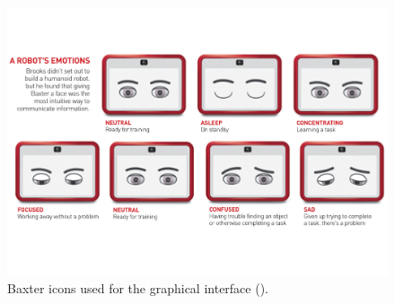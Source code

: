 \begin{figure}
	\centering
	\includegraphics[width=0.8\linewidth]{figures/baxter-icons.pdf}
	\caption{Baxter icons used for the graphical interface (\cite{baxteremojis}).}
	\label{fig:baxter-icons}
\end{figure}





